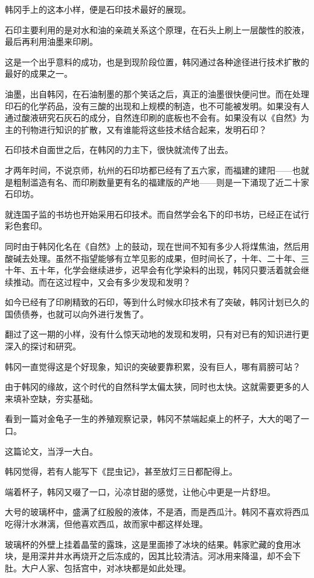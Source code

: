 韩冈手上的这本小样，便是石印技术最好的展现。

石印主要利用的是对水和油的亲疏关系这个原理，在石头上刷上一层酸性的胶液，最后再利用油墨来印刷。

这是一个出乎意料的成功，也是到现阶段位置，韩冈通过各种途径进行技术扩散的最好的成果之一。

油墨，出自韩冈，在石油制墨的那个笑话之后，真正的油墨很快便问世。而在处理印石的化学药品，没有三酸的出现和上规模的制造，也不可能被发明。如果没有人通过酸液研究石灰石的成分，自然连印刷的底板也不会有。如果没有以《自然》为主的刊物进行知识的扩散，又有谁能将这些技术结合起来，发明石印？

石印技术自面世之后，在韩冈的力主下，很快就流传了出去。

才两年时间，不说京师，杭州的石印坊都已经有了五六家，而福建的建阳——也就是粗制滥造有名、而印刷数量更有名的福建版的产地——则是一下涌现了近二十家石印坊。

就连国子监的书坊也开始采用石印技术。而自然学会名下的印书坊，已经正在试行彩色套印。

同时由于韩冈化名在《自然》上的鼓动，现在世间不知有多少人将煤焦油，然后用酸碱去处理。虽然不指望能够有立竿见影的成果，但时间长了，十年、二十年、三十年、五十年，化学会继续进步，迟早会有化学染料的出现，韩冈只要活着就会继续推动。而在这过程中，又会有多少发现和发明？

如今已经有了印刷精致的石印，等到什么时候水印技术有了突破，韩冈计划已久的国债债券，也就可以向外进行发售了。

翻过了这一期的小样，没有什么惊天动地的发现和发明，只有对已有的知识进行更深入的探讨和研究。

韩冈一直觉得这是个好现象，知识的突破要靠积累，没有巨人，哪有肩膀可站？

由于韩冈的缘故，这个时代的自然科学太偏太狭，同时也太快。这就需要更多的人来填补空缺，夯实基础。

看到一篇对金龟子一生的养殖观察记录，韩冈不禁端起桌上的杯子，大大的喝了一口。

这篇论文，当浮一大白。

韩冈觉得，若有人能写下《昆虫记》，甚至放灯三日都配得上。

端着杯子，韩冈又啜了一口，沁凉甘甜的感觉，让他心中更是一片舒坦。

大号的玻璃杯中，盛满了红殷殷的液体，不是酒，而是西瓜汁。韩冈不喜欢将西瓜吃得汁水淋漓，但他喜欢西瓜，故而家中都这样处理。

玻璃杯的外壁上挂着晶莹的露珠，这是里面掺了冰块的结果。韩家贮藏的食用冰块，是用深井井水再烧开之后冻成的，因其比较清洁。河冰用来降温，却不会下肚。大户人家、包括宫中，对冰块都是如此处理。

